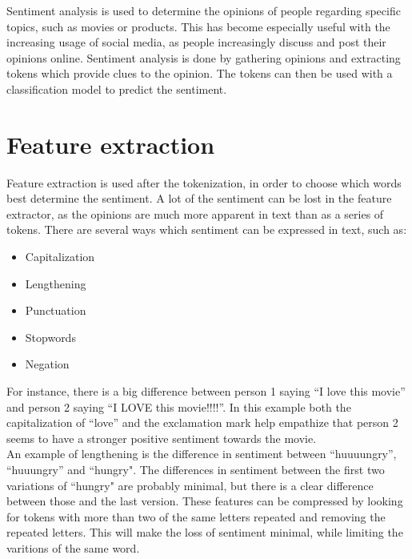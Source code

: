 



Sentiment analysis is used to determine the opinions of people regarding
specific topics, such as movies or products. This has become especially useful
with the increasing usage of social media, as people increasingly discuss and
post their opinions online. Sentiment analysis is done by
gathering opinions and extracting tokens which provide clues to the opinion. The tokens can then be
used with a classification model to predict the sentiment. 


\section{Feature extraction} 
Feature extraction is used after the tokenization, in order to choose which
words best determine the sentiment. A lot of the sentiment can be lost in the
feature extractor, as the opinions are much more apparent in text than as a
series of tokens. There are several ways which sentiment can be expressed in
text, such as\citep[Overview.3-4]{Sentiment}:

\begin{itemize}
  \item Capitalization 
  \item Lengthening
  \item Punctuation
  \item Stopwords
  \item Negation
\end{itemize}

For instance, there is a big difference between person 1 saying ``I love this
movie'' and person 2 saying ``I LOVE this movie!!!!''. In this example both the
capitalization of ``love'' and the exclamation mark help empathize that person
2 seems to have a stronger positive sentiment towards the movie.\\


An example of lengthening is the difference in sentiment between ``huuuungry'',
``huuungry'' and ``hungry". The differences in sentiment between the first two
variations of ``hungry" are probably minimal, but there is a clear difference
between those and the last version. These features can be compressed by looking
for tokens with more than two of the same letters repeated and removing the
repeated letters. This will make the loss of sentiment minimal, while limiting
the varitions of the same word.\nl

